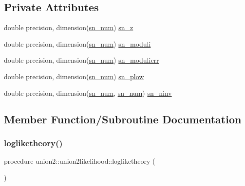 \subsection*{Private Attributes}
\begin{DoxyCompactItemize}
\item 
double precision, dimension(\mbox{\hyperlink{namespaceunion2_a263e630a36e6cdb0d23c6982c2d13b8e}{sn\+\_\+num}}) \mbox{\hyperlink{structunion2_1_1union2likelihood_a440d318d9c92aa180bcba6718dc1334a}{sn\+\_\+z}}
\item 
double precision, dimension(\mbox{\hyperlink{namespaceunion2_a263e630a36e6cdb0d23c6982c2d13b8e}{sn\+\_\+num}}) \mbox{\hyperlink{structunion2_1_1union2likelihood_a55465c072a132baa6c43b7e459f2d7d8}{sn\+\_\+moduli}}
\item 
double precision, dimension(\mbox{\hyperlink{namespaceunion2_a263e630a36e6cdb0d23c6982c2d13b8e}{sn\+\_\+num}}) \mbox{\hyperlink{structunion2_1_1union2likelihood_a74507d56416d98714f489fae825677dc}{sn\+\_\+modulierr}}
\item 
double precision, dimension(\mbox{\hyperlink{namespaceunion2_a263e630a36e6cdb0d23c6982c2d13b8e}{sn\+\_\+num}}) \mbox{\hyperlink{structunion2_1_1union2likelihood_a41fe0f203cdad7881d426ad17258b0bd}{sn\+\_\+plow}}
\item 
double precision, dimension(\mbox{\hyperlink{namespaceunion2_a263e630a36e6cdb0d23c6982c2d13b8e}{sn\+\_\+num}}, \mbox{\hyperlink{namespaceunion2_a263e630a36e6cdb0d23c6982c2d13b8e}{sn\+\_\+num}}) \mbox{\hyperlink{structunion2_1_1union2likelihood_a3d959974befaf9c28e571a03c5de6f67}{sn\+\_\+ninv}}
\end{DoxyCompactItemize}


\subsection{Member Function/\+Subroutine Documentation}
\mbox{\label{structunion2_1_1union2likelihood_aa1eacea20f0e7bf3c7240826272ca6d4}} 
\subsubsection{\texorpdfstring{logliketheory()}{logliketheory()}}
{\footnotesize\ttfamily procedure union2\+::union2likelihood\+::logliketheory (\begin{DoxyParamCaption}{ }\end{DoxyParamCaption})\hspace{0.3cm}{\ttfamily [private]}}



